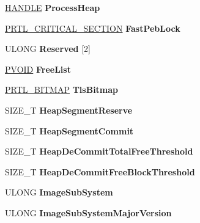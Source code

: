 \begin{DoxyCompactItemize}
\hyperlink{interfacevoid}{H\+A\+N\+D\+LE} {\bfseries Process\+Heap}
\item 
\mbox{\label{struct___p_e_b_aadb1d199ea3ea50573f1f2ae5d3b7c4f}} 
\hyperlink{struct___r_t_l___c_r_i_t_i_c_a_l___s_e_c_t_i_o_n}{P\+R\+T\+L\+\_\+\+C\+R\+I\+T\+I\+C\+A\+L\+\_\+\+S\+E\+C\+T\+I\+ON} {\bfseries Fast\+Peb\+Lock}
\item 
\mbox{\label{struct___p_e_b_a2ea03a87905ed1141f9c9f621069c63e}} 
U\+L\+O\+NG {\bfseries Reserved} \mbox{[}2\mbox{]}
\item 
\mbox{\label{struct___p_e_b_ae37c583493282d42e4faff4a2732491e}} 
\hyperlink{interfacevoid}{P\+V\+O\+ID} {\bfseries Free\+List}
\item 
\mbox{\label{struct___p_e_b_ab5f460f27a13b1cc9e9b0596321d82ef}} 
\hyperlink{struct___r_t_l___b_i_t_m_a_p}{P\+R\+T\+L\+\_\+\+B\+I\+T\+M\+AP} {\bfseries Tls\+Bitmap}
\item 
\mbox{\label{struct___p_e_b_aa0432aa36085713d6447562216e034ad}} 
S\+I\+Z\+E\+\_\+T {\bfseries Heap\+Segment\+Reserve}
\item 
\mbox{\label{struct___p_e_b_a1225a6611eb3b9f702bae7f24bfeb158}} 
S\+I\+Z\+E\+\_\+T {\bfseries Heap\+Segment\+Commit}
\item 
\mbox{\label{struct___p_e_b_a0d148b8d3ce3b67d71ab587a60fa49d6}} 
S\+I\+Z\+E\+\_\+T {\bfseries Heap\+De\+Commit\+Total\+Free\+Threshold}
\item 
\mbox{\label{struct___p_e_b_af85dd2a12150f041832b841488f1e3a2}} 
S\+I\+Z\+E\+\_\+T {\bfseries Heap\+De\+Commit\+Free\+Block\+Threshold}
\item 
\mbox{\label{struct___p_e_b_a745d9adf1550b95f667385fbea683d69}} 
U\+L\+O\+NG {\bfseries Image\+Sub\+System}
\item 
\mbox{\label{struct___p_e_b_ab4eaf64c6be27b80a37c2b46a03e6692}} 
U\+L\+O\+NG {\bfseries Image\+Sub\+System\+Major\+Version}
\item 
\mbox{\label{struct___p_e_b_a076ae367be7c4f4b2a234ae1df422fe6}} 

\end{DoxyCompactItemize}
